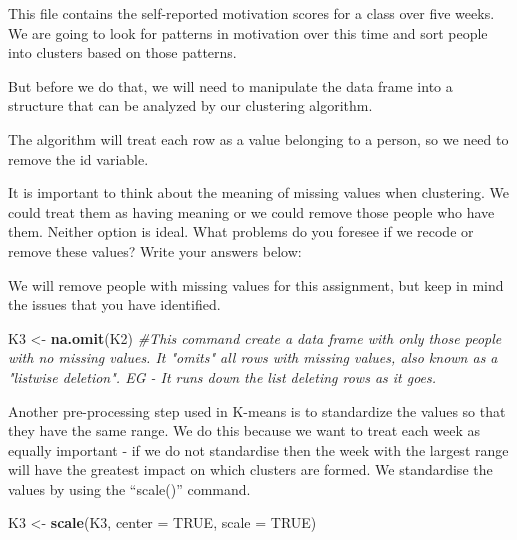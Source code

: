 \documentclass[
]{article}
\newenvironment{Shaded}{\begin{snugshade}}{\end{snugshade}}
\newcommand{\CommentTok}[1]{\textcolor[rgb]{0.56,0.35,0.01}{\textit{#1}}}
\newcommand{\DataTypeTok}[1]{\textcolor[rgb]{0.13,0.29,0.53}{#1}}
\newcommand{\KeywordTok}[1]{\textcolor[rgb]{0.13,0.29,0.53}{\textbf{#1}}}
\newcommand{\NormalTok}[1]{#1}
\newcommand{\OperatorTok}[1]{\textcolor[rgb]{0.81,0.36,0.00}{\textbf{#1}}}
\newcommand{\OtherTok}[1]{\textcolor[rgb]{0.56,0.35,0.01}{#1}}
\newcommand{\StringTok}[1]{\textcolor[rgb]{0.31,0.60,0.02}{#1}}
\begin{document}
This file contains the self-reported motivation scores for a class over
five weeks. We are going to look for patterns in motivation over this
time and sort people into clusters based on those patterns.

But before we do that, we will need to manipulate the data frame into a
structure that can be analyzed by our clustering algorithm.

The algorithm will treat each row as a value belonging to a person, so
we need to remove the id variable.

\begin{Shaded}
\end{Shaded}

It is important to think about the meaning of missing values when
clustering. We could treat them as having meaning or we could remove
those people who have them. Neither option is ideal. What problems do
you foresee if we recode or remove these values? Write your answers
below:

We will remove people with missing values for this assignment, but keep
in mind the issues that you have identified.

\begin{Shaded}
\begin{Highlighting}[]
\NormalTok{K3 <-}\StringTok{ }\KeywordTok{na.omit}\NormalTok{(K2) }\CommentTok{#This command create a data frame with only those people with no missing values. It "omits" all rows with missing values, also known as a "listwise deletion". EG - It runs down the list deleting rows as it goes.}
\end{Highlighting}
\end{Shaded}

Another pre-processing step used in K-means is to standardize the values
so that they have the same range. We do this because we want to treat
each week as equally important - if we do not standardise then the week
with the largest range will have the greatest impact on which clusters
are formed. We standardise the values by using the ``scale()'' command.

\begin{Shaded}
\begin{Highlighting}[]
\NormalTok{K3 <-}\StringTok{ }\KeywordTok{scale}\NormalTok{(K3, }\DataTypeTok{center =} \OtherTok{TRUE}\NormalTok{, }\DataTypeTok{scale =} \OtherTok{TRUE}\NormalTok{)}
\end{Highlighting}
\end{Shaded}
\end{document}
